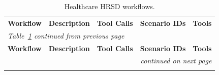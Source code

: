 {\small\begin{longtable}{
  p{}
  p{}
  p{}
  p{}
  p{}}
\captionsetup{font=small}
\caption{Healthcare HRSD workflows.}
\label{tab:workflows-hrsd} \\
\toprule
\textbf{Workflow} & \textbf{Description} & \textbf{Tool Calls} & \textbf{Scenario IDs} & \textbf{Tools} \\
\midrule
\endfirsthead
\multicolumn{5}{l}{\emph{Table~\ref{tab:workflows-hrsd} continued from previous page}} \\
\toprule
\textbf{Workflow} & \textbf{Description} & \textbf{Tool Calls} & \textbf{Scenario IDs} & \textbf{Tools} \\
\midrule
\endhead
\midrule \multicolumn{5}{r}{\emph{continued on next page}} \\
\endfoot
\bottomrule
\endlastfoot


\end{longtable}}
